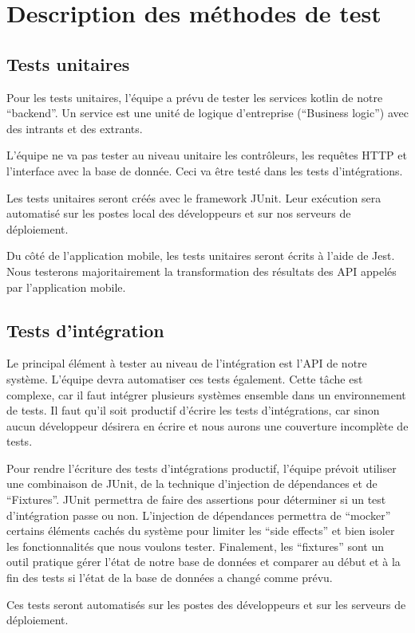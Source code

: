 \section{Description des méthodes de test}
	\subsection{Tests unitaires}
	Pour les tests unitaires, l’équipe a prévu de tester les services kotlin de notre “backend”. Un service est une unité de logique d’entreprise (“Business logic”) avec des intrants et des extrants. 

	L’équipe ne va pas tester au niveau unitaire les contrôleurs, les requêtes HTTP et l'interface avec la base de donnée. Ceci va être testé dans les tests d’intégrations.

	Les tests unitaires seront créés avec le framework JUnit. Leur exécution sera automatisé sur les postes local des développeurs et sur nos serveurs de déploiement. 

	Du côté de l’application mobile, les tests unitaires seront écrits à l’aide de Jest. Nous testerons majoritairement la transformation des résultats des API appelés par l’application mobile. 

	\subsection{Tests d'intégration}
	Le principal élément à tester au niveau de l’intégration est l’API de notre système. L’équipe devra automatiser ces tests également. Cette tâche est complexe, car il faut intégrer plusieurs systèmes ensemble dans un environnement de tests. Il faut qu’il soit productif d’écrire les tests d’intégrations, car sinon aucun développeur désirera en écrire et nous aurons une couverture incomplète de tests.

	Pour rendre l’écriture des tests d’intégrations productif, l’équipe prévoit utiliser une combinaison de JUnit, de la technique d’injection de dépendances et de “Fixtures”. JUnit permettra de faire des assertions pour déterminer si un test d’intégration passe ou non. L’injection de dépendances permettra de “mocker” certains éléments cachés du système pour limiter les “side effects” et bien isoler les fonctionnalités que nous voulons tester. Finalement, les “fixtures” sont un outil pratique gérer l’état de notre base de données et comparer au début et à la fin des tests si l’état de la base de données a changé comme prévu.

	Ces tests seront automatisés sur les postes des développeurs et sur les serveurs de déploiement.

